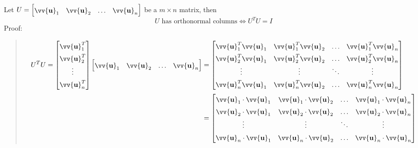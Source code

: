 \documentclass[11pt]{article}
\DeclareRobustCommand{\myvec}[1]{\vv{\mathbf{#1}}}
\newcommand{\mymat}[1]{#1}
\begin{document}
    Let $\mymat{U} = \begin{bmatrix} \myvec{u}_1 & \myvec{u}_2 & \dots & \myvec{u}_n \end{bmatrix}$ be a $m \times n$ matrix, then
    \begin{equation}
        \mymat{U}\text{ has orthonormal columns} \iff \mymat{U}^T \mymat{U} = \mymat{I}
    \end{equation}
    Proof:
    \begin{quote}
        \begin{align*}
            \renewcommand{\arraystretch}{1.5}
            \mymat{U}^{T} \mymat{U} = 
                \begin{bmatrix} \myvec{u}_1^T \\ \myvec{u}_2^T \\ \vdots \\ \myvec{u}_n^T \end{bmatrix}
                \begin{bmatrix} \myvec{u}_1 & \myvec{u}_2 & \dots & \myvec{u}_n \end{bmatrix}
                &= \begin{bmatrix}
                    \myvec{u}_1^T \myvec{u}_1 & \myvec{u}_1^T \myvec{u}_2 & \dots  & \myvec{u}_1^T \myvec{u}_n \\
                    \myvec{u}_2^T \myvec{u}_1 & \myvec{u}_2^T \myvec{u}_2 & \dots  & \myvec{u}_2^T \myvec{u}_n \\
                    \vdots                    & \vdots                    & \ddots & \vdots \\
                    \myvec{u}_n^T \myvec{u}_1 & \myvec{u}_n^T \myvec{u}_2 & \dots  & \myvec{u}_n^T \myvec{u}_n
                \end{bmatrix} \\
            &= \begin{bmatrix}
                    \myvec{u}_1 \cdot \myvec{u}_1 & \myvec{u}_1 \cdot \myvec{u}_2 & \dots  & \myvec{u}_1 \cdot \myvec{u}_n \\
                    \myvec{u}_2 \cdot \myvec{u}_1 & \myvec{u}_2 \cdot \myvec{u}_2 & \dots  & \myvec{u}_2 \cdot \myvec{u}_n \\
                    \vdots                    & \vdots                    & \ddots & \vdots \\
                    \myvec{u}_n \cdot \myvec{u}_1 & \myvec{u}_n \cdot \myvec{u}_2 & \dots  & \myvec{u}_n \cdot \myvec{u}_n
                \end{bmatrix}
        \end{align*}

\end{quote}
\end{document}
